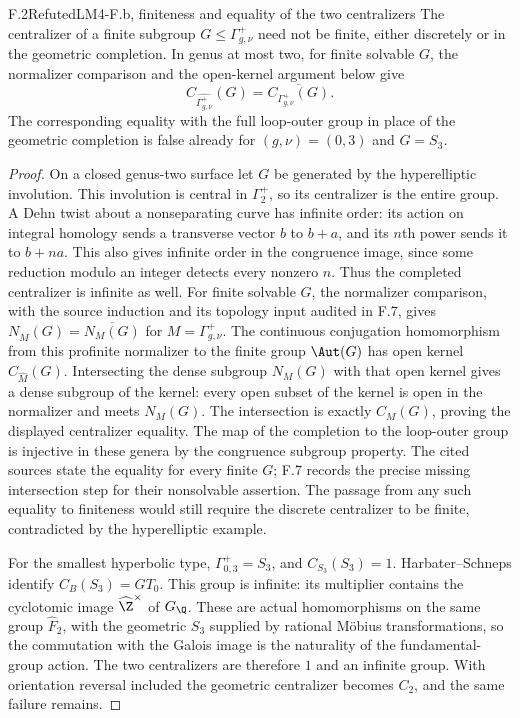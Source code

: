 \begin{claim}{F.2}{Refuted}{LM4-F.b, finiteness and equality of the two centralizers}
\label{LM4-F.b}
The centralizer of a finite subgroup $G\leq\Gamma^+_{g,\nu}$ need not be finite, either discretely or in the geometric completion. In genus at most two, for finite solvable $G$, the normalizer comparison and the open-kernel argument below give
\[
 C_{\widehat{\Gamma^+_{g,\nu}}}(G)
       =\overline{C_{\Gamma^+_{g,\nu}}(G)}.
\]
The corresponding equality with the full loop-outer group in place of the geometric completion is false already for $(g,\nu)=(0,3)$ and $G=S_3$.
\end{claim}
\begin{proof}
On a closed genus-two surface let $G$ be generated by the hyperelliptic involution. This involution is central in $\Gamma_2^+$, so its centralizer is the entire group. A Dehn twist about a nonseparating curve has infinite order: its action on integral homology sends a transverse vector $b$ to $b+a$, and its $n$th power sends it to $b+na$. This also gives infinite order in the congruence image, since some reduction modulo an integer detects every nonzero $n$. Thus the completed centralizer is infinite as well. For finite solvable $G$, the normalizer comparison, with the source induction and its topology input audited in F.7, gives $N_{\widehat M}(G)=\overline{N_M(G)}$ for $M=\Gamma^+_{g,\nu}$. The continuous conjugation homomorphism from this profinite normalizer to the finite group $\Aut(G)$ has open kernel $C_{\widehat M}(G)$. Intersecting the dense subgroup $N_M(G)$ with that open kernel gives a dense subgroup of the kernel: every open subset of the kernel is open in the normalizer and meets $N_M(G)$. The intersection is exactly $C_M(G)$, proving the displayed centralizer equality. The map of the completion to the loop-outer group is injective in these genera by the congruence subgroup property. The cited sources state the equality for every finite $G$; F.7 records the precise missing intersection step for their nonsolvable assertion. The passage from any such equality to finiteness would still require the discrete centralizer to be finite, contradicted by the hyperelliptic example.

For the smallest hyperbolic type, $\Gamma_{0,3}^+=S_3$, and $C_{S_3}(S_3)=1$. Harbater--Schneps identify $C_B(S_3)=GT_0$. This group is infinite: its multiplier contains the cyclotomic image $\widehat\Z^\times$ of $G_\Q$. These are actual homomorphisms on the same group $\widehat F_2$, with the geometric $S_3$ supplied by rational M\"obius transformations, so the commutation with the Galois image is the naturality of the fundamental-group action. The two centralizers are therefore $1$ and an infinite group. With orientation reversal included the geometric centralizer becomes $C_2$, and the same failure remains.


\end{proof}
